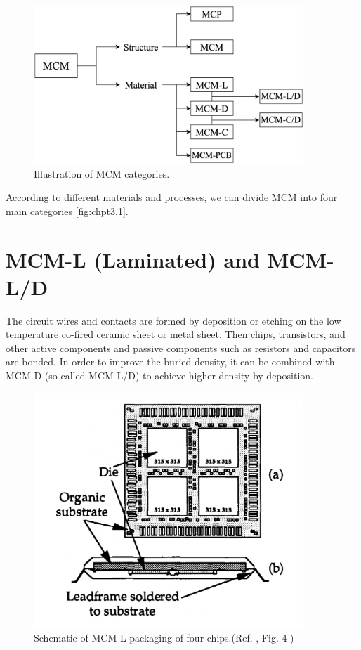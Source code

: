 \begin{spacing}{1.5}
\begin{figure}[ht]
	\centering
	\includegraphics[width=4in, fbox]{Chapter3/mcm1(1).eps}
	\caption{Illustration of MCM categories.}
	\label{fig:chpt3.1} 
\end{figure}

According to different materials and processes, we can divide MCM into four main categories \autoref{fig:chpt3.1}. 

\section{MCM-L (Laminated) and MCM-L/D}

The circuit wires and contacts are formed by deposition or etching on the low temperature co-fired ceramic sheet or metal sheet. Then chips, transistors, and other active components and passive components such as resistors and capacitors are bonded. In order to improve the buried density, it can be combined with MCM-D (so-called MCM-L/D) to achieve higher density by deposition. 

\begin{figure}[ht]
	\centering
	\includegraphics[width=4in, fbox]{Chapter3/2.eps}
	\caption{Schematic of MCM-L packaging of four chips.(Ref. \cite{nachnani1993low}, Fig. 4 )}
	\label{fig:chpt3.2} 
\end{figure}


\end{spacing}
